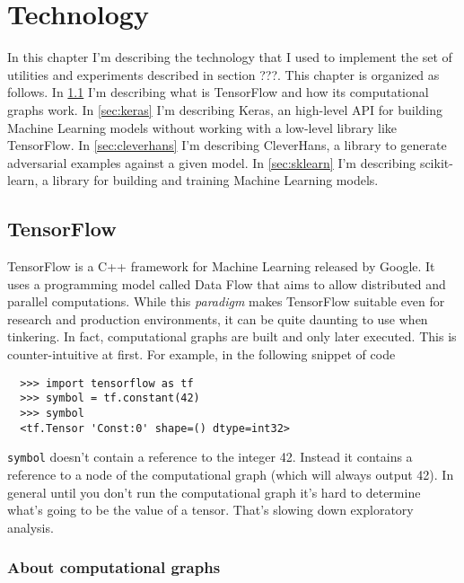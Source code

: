 \chapter{Technology}

In this chapter I'm describing the technology that I used to implement
the set of utilities and experiments described in section ???. This
chapter is organized as follows. In \ref{sec:tensorflow} I'm describing
what is TensorFlow and how its computational graphs work. In
\ref{sec:keras} I'm describing Keras, an high-level API for building
Machine Learning models without working with a low-level library like
TensorFlow. In \ref{sec:cleverhans} I'm describing CleverHans, a
library to generate adversarial examples against a given model. In
\ref{sec:sklearn} I'm describing scikit-learn, a library for building
and training Machine Learning models.

\section{TensorFlow}
\label{sec:tensorflow}

TensorFlow is a C++ framework for Machine Learning released by Google.
It uses a programming model called Data Flow that aims to allow
distributed and parallel computations. While this \emph{paradigm} makes
TensorFlow suitable even for research and production environments, it
can be quite daunting to use when tinkering. In fact, computational
graphs are built and only later executed. This is counter-intuitive at
first. For example, in the following snippet of code

\begin{verbatim}
  >>> import tensorflow as tf
  >>> symbol = tf.constant(42)
  >>> symbol 
  <tf.Tensor 'Const:0' shape=() dtype=int32>
\end{verbatim}

\texttt{symbol} doesn't contain a reference to the integer 42. Instead
it contains a reference to a node of the computational graph (which
will always output 42). In general until you don't run the
computational graph it's hard to determine what's going to be the value
of a tensor. That's slowing down exploratory analysis.

\subsection{About computational graphs}
\label{subsec:computational-graph}

